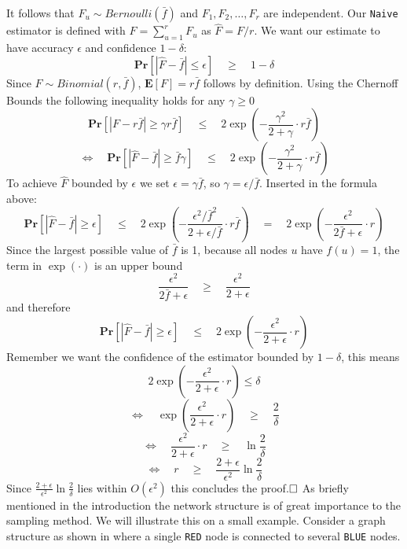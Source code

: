 It follows that $F_u \sim  Bernoulli(\bar{f})$ and $F_1, F_2, \ldots , F_r$ are independent.
Our \texttt{Naive} estimator is defined with $F = \sum_{u=1}^{r} F_u$ as $\hat{F} = F/r$.
We want our estimate to have accuracy $\epsilon$ and confidence $1-\delta$:
$$\textbf{Pr}[|\hat{F}-\bar{f} | \leq \epsilon] \quad\geq\quad 1-\delta$$
Since $F \sim Binomial(r,\bar{f})$, $\textbf{E}[F] = r\bar{f}$ follows by definition.
Using the Chernoff Bounds the following inequality holds for any $\gamma \geq 0$
$$\textbf{Pr}[|F-r\bar{f}|\geq \gamma r\bar{f}] \quad\leq\quad 2\exp(-\frac{\gamma^2}{2+\gamma}\cdot r\bar{f})$$
$$\Leftrightarrow\quad \textbf{Pr}[|\hat{F}-\bar{f}|\geq \bar{f}\gamma] \quad\leq\quad 2\exp(-\frac{\gamma^2}{2+\gamma}\cdot r\bar{f})$$
To achieve $\hat{F}$ bounded by $\epsilon$ we set $\epsilon = \gamma\bar{f}$, so $\gamma = \epsilon/\bar{f}$. Inserted in the formula above:
$$\textbf{Pr}[|\hat{F}-\bar{f}| \geq \epsilon] \quad\leq\quad 2\exp (-\frac{\epsilon^2/\bar{f}^2}{2+\epsilon/\bar{f}}\cdot r\bar{f}) \quad=\quad 2\exp(-\frac{\epsilon^2}{2\bar{f}+\epsilon}\cdot r)$$
Since the largest possible value of $\bar{f}$ is 1, because all nodes $u$ have $f(u) = 1$, the term in $\exp(\cdot)$ is an upper bound
$$\frac{\epsilon^2}{2\bar{f}+\epsilon} \quad\geq\quad \frac{\epsilon^2}{2+\epsilon}$$
and therefore
$$\textbf{Pr}[|\hat{F}-\bar{f}| \geq \epsilon] \quad\leq\quad 2\exp(-\frac{\epsilon^2}{2+\epsilon}\cdot r)$$
Remember we want the confidence of the estimator bounded by $1-\delta$, this means
$$2\exp(-\frac{\epsilon^2}{2+\epsilon}\cdot r) \leq \delta$$
$$\Leftrightarrow\quad \exp(\frac{\epsilon^2}{2+\epsilon}\cdot r) \quad\geq\quad \frac{2}{\delta}$$
$$\Leftrightarrow\quad \frac{\epsilon^2}{2+\epsilon}\cdot r \quad\geq\quad \ln\frac{2}{\delta}$$
$$\Leftrightarrow\quad r \quad\geq\quad \frac{2+\epsilon}{\epsilon^2}\ln\frac{2}{\delta}$$
Since $\frac{2+\epsilon}{\epsilon^2}\ln\frac{2}{\delta}$ lies within $O(\epsilon^2)$ this concludes the proof.$\hfill\square$
\newline\newline
As briefly mentioned in the introduction the network structure is of great importance to the sampling method.
We will illustrate this on a small example. Consider a graph structure as shown in  where a single \texttt{RED} node is connected to several \texttt{BLUE} nodes.
